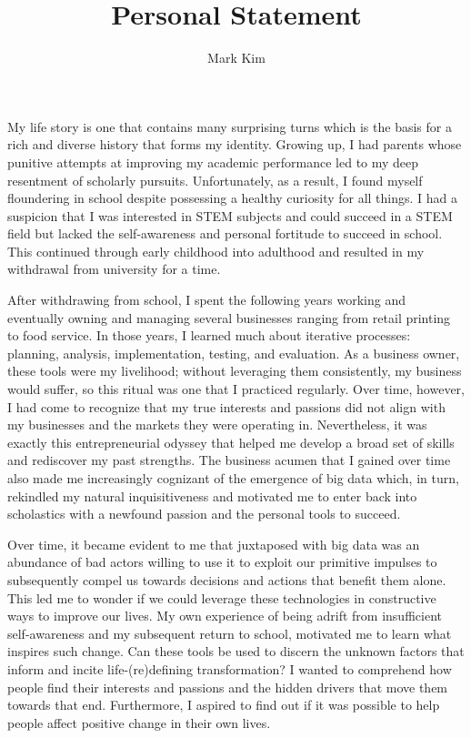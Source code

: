 \documentclass[12pt]{article}
\title{Personal Statement}
\author{Mark Kim}
\begin{document}
\maketitle

My life story is one that contains many surprising turns which is the basis for a rich and diverse history that forms my identity.  Growing
up, I had parents whose punitive attempts at improving my academic performance led to my deep resentment of scholarly pursuits.
Unfortunately, as a result, I found myself floundering in school despite possessing a healthy curiosity for all things.  I had a suspicion
that I was interested in STEM subjects and could succeed in a STEM field but lacked the self-awareness and personal fortitude to succeed in
school.  This continued through early childhood into adulthood and resulted in my withdrawal from university for a time.

After withdrawing from school, I spent the following years working and eventually owning and managing several businesses ranging from
retail printing to food service.  In those years, I learned much about iterative processes: planning, analysis, implementation, testing, and
evaluation.  As a business owner, these tools were my livelihood; without leveraging them consistently, my business would suffer, so this
ritual was one that I practiced regularly. Over time, however, I had come to recognize that my true interests and passions did not align
with my businesses and the markets they were operating in. Nevertheless, it was exactly this entrepreneurial odyssey that helped me develop
a broad set of skills and rediscover my past strengths.  The business acumen that I gained over time also made me increasingly cognizant of
the emergence of big data which, in turn, rekindled my natural inquisitiveness and motivated me to enter back into scholastics with a
newfound passion and the personal tools to succeed.

Over time, it became evident to me that juxtaposed with big data was an abundance of bad actors willing to use it to exploit our primitive
impulses to subsequently compel us towards decisions and actions that benefit them alone. This led me to wonder if we could leverage these
technologies in constructive ways to improve our lives. My own experience of being adrift from insufficient self-awareness and my subsequent
return to school, motivated me to learn what inspires such change. Can these tools be used to discern the unknown factors that inform and
incite life-(re)defining transformation?  I wanted to comprehend how people find their interests and passions and the hidden drivers that
move them towards that end.  Furthermore, I aspired to find out if it was possible to help people affect positive change in their own lives.
\end{document}
